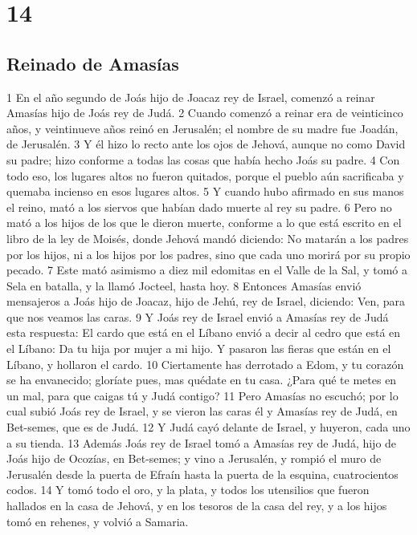 \chapter{14}

\section*{Reinado de Amasías}

 

1 En el año segundo de Joás hijo de Joacaz rey de Israel, comenzó a reinar Amasías hijo de Joás rey de Judá.
2 Cuando comenzó a reinar era de veinticinco años, y veintinueve años reinó en Jerusalén; el nombre de su madre fue Joadán, de Jerusalén.
3 Y él hizo lo recto ante los ojos de Jehová, aunque no como David su padre; hizo conforme a todas las cosas que había hecho Joás su padre.
4 Con todo eso, los lugares altos no fueron quitados, porque el pueblo aún sacrificaba y quemaba incienso en esos lugares altos.
5 Y cuando hubo afirmado en sus manos el reino, mató a los siervos que habían dado muerte al rey su padre.
6 Pero no mató a los hijos de los que le dieron muerte, conforme a lo que está escrito en el libro de la ley de Moisés, donde Jehová mandó diciendo: No matarán a los padres por los hijos, ni a los hijos por los padres, sino que cada uno morirá por su propio pecado. 
7 Este mató asimismo a diez mil edomitas en el Valle de la Sal, y tomó a Sela en batalla, y la llamó Jocteel, hasta hoy.
8 Entonces Amasías envió mensajeros a Joás hijo de Joacaz, hijo de Jehú, rey de Israel, diciendo: Ven, para que nos veamos las caras.
9 Y Joás rey de Israel envió a Amasías rey de Judá esta respuesta: El cardo que está en el Líbano envió a decir al cedro que está en el Líbano: Da tu hija por mujer a mi hijo. Y pasaron las fieras que están en el Líbano, y hollaron el cardo.
10 Ciertamente has derrotado a Edom, y tu corazón se ha envanecido; gloríate pues, mas quédate en tu casa. ¿Para qué te metes en un mal, para que caigas tú y Judá contigo?
11 Pero Amasías no escuchó; por lo cual subió Joás rey de Israel, y se vieron las caras él y Amasías rey de Judá, en Bet-semes, que es de Judá.
12 Y Judá cayó delante de Israel, y huyeron, cada uno a su tienda.
13 Además Joás rey de Israel tomó a Amasías rey de Judá, hijo de Joás hijo de Ocozías, en Bet-semes; y vino a Jerusalén, y rompió el muro de Jerusalén desde la puerta de Efraín hasta la puerta de la esquina, cuatrocientos codos.
14 Y tomó todo el oro, y la plata, y todos los utensilios que fueron hallados en la casa de Jehová, y en los tesoros de la casa del rey, y a los hijos tomó en rehenes, y volvió a Samaria.
